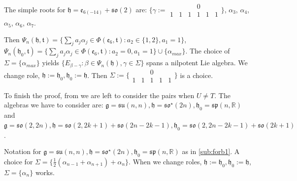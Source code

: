 \documentclass[12pt]{amsart}
\theoremstyle{definition}
\theoremstyle{remark}
\newcommand{\g}{\mathfrak{g}}
\newcommand{\h}{\mathfrak{h}}
\renewcommand{\t}{{\mathfrak t}}
\numberwithin{equation}{section}
\begin{document}
The simple roots for  $   \h=\mathfrak{e}_{6(-14)}+\mathfrak{so}(2)  $ are:
  $\{ \gamma :=\begin{smallmatrix}
   & &   & 0 &   &   \\
  1&1& 1 & 1 & 1 & 1
\end{smallmatrix}\} $,   $\alpha_3$, $\alpha_4$, $\alpha_5$, $\alpha_6$, $\alpha_7$.









 Then   $\Psi_n(\h ,\t)=\{  \sum_j a_j \alpha_j \in \Phi(\mathfrak e_6,\mathfrak t) :  a_2 \in \{1,2\}, a_1=1\}$, $ \Psi_n(\h_0,  \t)=\{  \sum_j a_j \alpha_j \in \Phi(\mathfrak e_6,\mathfrak t) :  a_2=0, a_1=1 \}\cup \{\alpha_{max} \}$. The choice of $\Sigma=\{\alpha_{max} \}$    yields $\{E_{\beta -\gamma} : \beta \in \Psi_n(\h), \gamma \in \Sigma\}$ spans a nilpotent Lie algebra. We change role, $\h :=\h_0, \h_0 :=\h
 $. Then $\Sigma:=\{ \begin{smallmatrix}
    &   & 0 &   &   \\
  1& 1 & 1 & 1 & 1
\end{smallmatrix}\} $ is a choice.


\smallskip
To finish the proof, from   \cite{Va} \cite{Kob9} \cite{KOadv} we are left to consider the pairs when $U\not= T$. The algebras we have to consider are: $\g= \mathfrak{su}(n,n), \h=\mathfrak{so}^\star(2n), \h_0=\mathfrak{sp}(n,\mathbb R)$ and $\g=\mathfrak{so}(2,2n), \h=\mathfrak{so}(2,2k+1)+\mathfrak{so}(2n-2k-1), \h_0=\mathfrak{so}(2,2n-2k-1)+\mathfrak{so}(2k+1)$.

\smallskip
Notation for $\g= \mathfrak{su}(n,n), \h=\mathfrak{so}^\star(2n), \h_0=\mathfrak{sp}(n,\mathbb R)$ as in \ref{sub:forb1}. A choice for $\Sigma=\{\frac12(\alpha_{n-1}+\alpha_{n+1})+\alpha_{n}\}$. When we change roles, $\h:=\h_0, \h_0:=\h$, $\Sigma=\{\alpha_{n}\}$ works.
\end{document}
